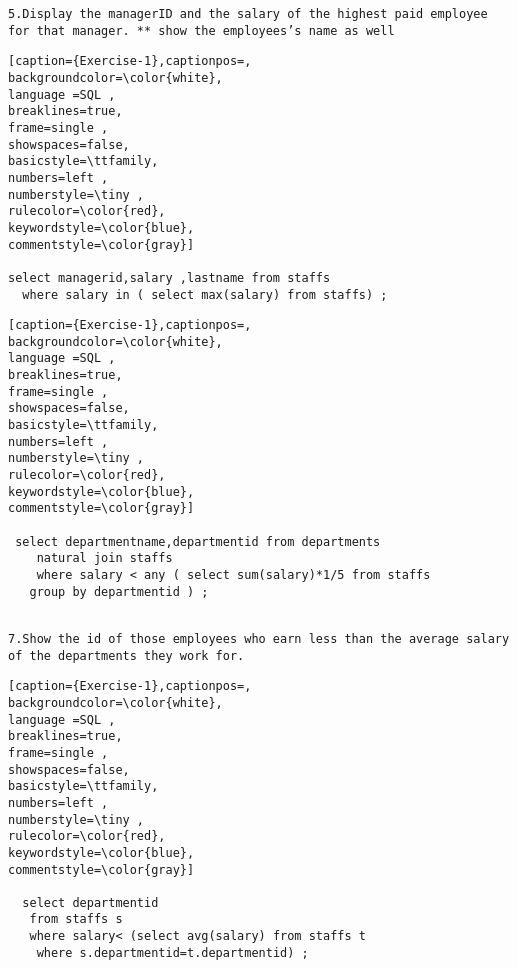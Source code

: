 \documentclass[12pt,a4paper]{article}
\begin{document}
\vspace{1cm}
{\tt{5.Display the managerID and the salary of the highest paid employee for that manager. ** show the 
employees’s name as well\\}}


\begin{lstlisting}[caption={Exercise-1},captionpos=,
backgroundcolor=\color{white},
language =SQL ,
breaklines=true,
frame=single ,
showspaces=false,
basicstyle=\ttfamily,
numbers=left ,
numberstyle=\tiny ,
rulecolor=\color{red},
keywordstyle=\color{blue},
commentstyle=\color{gray}]
 
select managerid,salary ,lastname from staffs
  where salary in ( select max(salary) from staffs) ;

\end{lstlisting} 





\vspace{1cm}




\begin{lstlisting}[caption={Exercise-1},captionpos=,
backgroundcolor=\color{white},
language =SQL ,
breaklines=true,
frame=single ,
showspaces=false,
basicstyle=\ttfamily,
numbers=left ,
numberstyle=\tiny ,
rulecolor=\color{red},
keywordstyle=\color{blue},
commentstyle=\color{gray}]

 select departmentname,departmentid from departments
    natural join staffs
    where salary < any ( select sum(salary)*1/5 from staffs
   group by departmentid ) ;
 

\end{lstlisting} 



\vspace{1cm}
{\tt{7.Show the id of those employees who earn less than the average salary of the departments they 
work for.\\}}


\begin{lstlisting}[caption={Exercise-1},captionpos=,
backgroundcolor=\color{white},
language =SQL ,
breaklines=true,
frame=single ,
showspaces=false,
basicstyle=\ttfamily,
numbers=left ,
numberstyle=\tiny ,
rulecolor=\color{red},
keywordstyle=\color{blue},
commentstyle=\color{gray}]
 
  select departmentid
   from staffs s
   where salary< (select avg(salary) from staffs t
    where s.departmentid=t.departmentid) ;

\end{lstlisting} 
\end{document}
